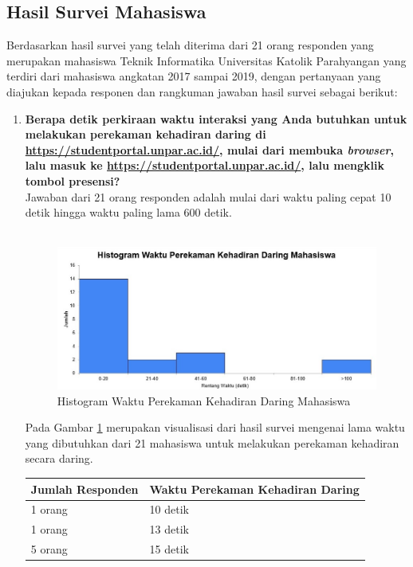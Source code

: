\subsection{Hasil Survei Mahasiswa}
Berdasarkan hasil survei yang telah diterima dari 21 orang responden yang merupakan mahasiswa Teknik Informatika Universitas Katolik
Parahyangan yang terdiri dari mahasiswa angkatan 2017 sampai 2019, dengan pertanyaan yang diajukan kepada responen dan rangkuman jawaban hasil survei sebagai berikut:
\begin{enumerate}
	\item \textbf{Berapa detik perkiraan waktu interaksi yang Anda butuhkan untuk melakukan perekaman kehadiran daring di \url{https://studentportal.unpar.ac.id/}, mulai dari membuka \textit{browser}, lalu masuk ke \url{https://studentportal.unpar.ac.id/}, lalu mengklik tombol presensi?}\\
	Jawaban dari 21 orang responden adalah mulai dari waktu paling cepat 10 detik hingga waktu paling lama 600 detik.\\ \\
	\begin{figure}[H]
		\centering
		\includegraphics[scale=1]{Gambar/DaringMahasiswa.jpg}
		\caption{Histogram Waktu Perekaman Kehadiran Daring Mahasiswa} 
		\label{fig:DaringMahasiswa}
	\end{figure}
	Pada Gambar \ref{fig:DaringMahasiswa} merupakan visualisasi dari hasil survei mengenai lama waktu yang dibutuhkan dari 21 mahasiswa untuk melakukan perekaman kehadiran secara daring.\\
	 \begin{tabular}{|p{4cm} |p{7cm}|}
		\hline
		Jumlah Responden &  Waktu Perekaman Kehadiran Daring \\ \hline     
		1 orang &  10 detik\\ \hline 
		1 orang &  13 detik\\ \hline 
		5 orang &  15 detik\\ \hline 

\end{tabular}
\end{enumerate}
